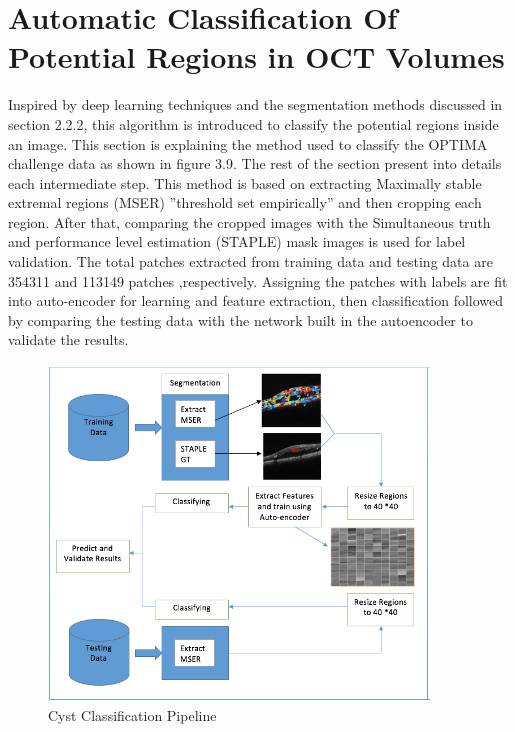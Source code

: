 \section{Automatic Classification Of Potential Regions in OCT Volumes}
Inspired by deep learning techniques and the segmentation methods discussed in section 2.2.2, this algorithm is introduced to classify the potential regions inside an image.
This section is explaining the method used to classify the OPTIMA challenge data as shown in figure 3.9.
The rest of the section present into details each intermediate step.
This method is based on extracting Maximally stable extremal regions (MSER) ''threshold set empirically'' and then cropping each region.
After that, comparing the cropped images with the Simultaneous truth and performance level estimation (STAPLE) mask images is used for label validation.
The total patches extracted from training data and testing data are  354311 and 113149 patches ,respectively. 
Assigning the patches with labels are fit into auto-encoder for learning and feature extraction, then classification followed by comparing the testing data with the network built in the autoencoder to validate the results.

\begin{figure}[htb]
        \centering
        \includegraphics[width = 0.9\textwidth, height = 0.5\textheight]{figures/Segmentation.png} %
  \caption{Cyst Classification Pipeline}
  \label{fig:Segmentation Pipeline}
\end{figure} 
